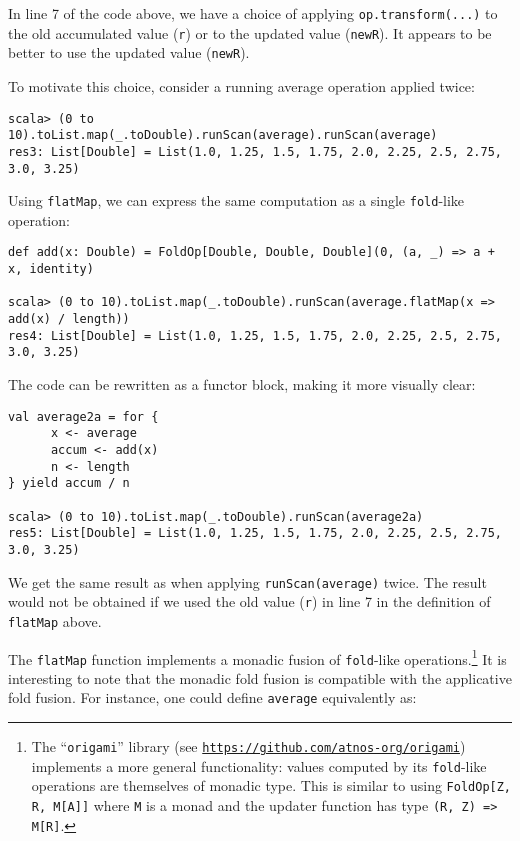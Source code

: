 In line 7 of the code above, we have a choice of applying \lstinline!op.transform(...)!
to the old accumulated value (\lstinline!r!) or to the updated value
(\lstinline!newR!). It appears to be better to use the updated value
(\lstinline!newR!). 

To motivate this choice, consider a running average operation applied
twice:
\begin{lstlisting}
scala> (0 to 10).toList.map(_.toDouble).runScan(average).runScan(average)
res3: List[Double] = List(1.0, 1.25, 1.5, 1.75, 2.0, 2.25, 2.5, 2.75, 3.0, 3.25)
\end{lstlisting}
Using \lstinline!flatMap!, we can express the same computation as
a single \lstinline!fold!-like operation:
\begin{lstlisting}
def add(x: Double) = FoldOp[Double, Double, Double](0, (a, _) => a + x, identity)

scala> (0 to 10).toList.map(_.toDouble).runScan(average.flatMap(x => add(x) / length))
res4: List[Double] = List(1.0, 1.25, 1.5, 1.75, 2.0, 2.25, 2.5, 2.75, 3.0, 3.25)
\end{lstlisting}
The code can be rewritten as a functor block, making it more visually
clear:
\begin{lstlisting}
val average2a = for {
      x <- average
      accum <- add(x)
      n <- length
} yield accum / n

scala> (0 to 10).toList.map(_.toDouble).runScan(average2a)
res5: List[Double] = List(1.0, 1.25, 1.5, 1.75, 2.0, 2.25, 2.5, 2.75, 3.0, 3.25)
\end{lstlisting}
We get the same result as when applying \lstinline!runScan(average)!
twice. The result would not be obtained if we used the old value (\lstinline!r!)
in line 7 in the definition of \lstinline!flatMap! above.

The \lstinline!flatMap! function implements a monadic fusion of \lstinline!fold!-like
operations.\footnote{The \textsf{``}\texttt{origami}\textsf{''} library (see \texttt{\href{https://github.com/atnos-org/origami}{https://github.com/atnos-org/origami}})
implements a more general functionality: values computed by its \lstinline!fold!-like
operations are themselves of monadic type. This is similar to using
\lstinline!FoldOp[Z, R, M[A]]! where \lstinline!M! is a monad and
the updater function has type \lstinline!(R, Z) => M[R]!.} It is interesting to note that the monadic fold fusion is compatible
with the applicative fold fusion. For instance, one could define \lstinline!average!
equivalently as:

